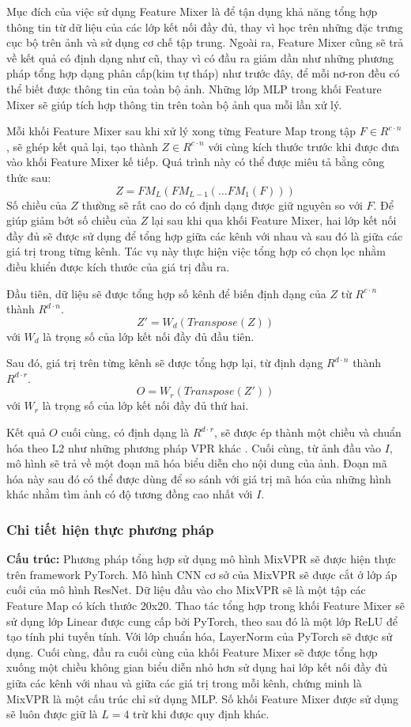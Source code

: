 Mục đích của việc sử dụng Feature Mixer là để tận dụng khả năng tổng hợp thông tin từ dữ liệu của các lớp kết nối đầy đủ, thay vì học trên những đặc trưng cục bộ trên ảnh và sử dụng cơ chế tập trung. Ngoài ra, Feature Mixer cũng sẽ trả về kết quả có định dạng như cũ, thay vì có đầu ra giảm dần như những phương pháp tổng hợp dạng phân cấp(kim tự tháp) như trước đây, để mỗi nơ-ron đều có thể biết được thông tin của toàn bộ ảnh. Những lớp MLP trong khối Feature Mixer sẽ giúp tích hợp thông tin trên toàn bộ ảnh qua mỗi lần xử lý.

Mỗi khối Feature Mixer sau khi xử lý xong từng Feature Map trong tập $F \in R^{c \cdot n}$, sẽ ghép kết quả lại, tạo thành $Z \in R^{c \cdot n}$ với cùng kích thước trước khi được đưa vào khối Feature Mixer kế tiếp. Quá trình này có thể được miêu tả bằng công thức sau:
$$
Z = FM_L(FM_{L-1}(\dots FM_1(F)))
$$
Số chiều của $Z$ thường sẽ rất cao do có định dạng được giữ nguyên so với $F$. Để giúp giảm bớt số chiều của $Z$ lại sau khi qua khối Feature Mixer, hai lớp kết nối đầy đủ sẽ được sử dụng để tổng hợp giữa các kênh với nhau và sau đó là giữa các giá trị trong từng kênh. Tác vụ này thực hiện việc tổng hợp có chọn lọc nhằm điều khiển được kích thước của giá trị đầu ra.

Đầu tiên, dữ liệu sẽ được tổng hợp số kênh để biến định dạng của $Z$ từ $R^{c \cdot n}$ thành $R^{d \cdot n}$.
$$
Z' = W_d(Transpose(Z))
$$
với $W_d$ là trọng số của lớp kết nối đầy đủ đầu tiên.

Sau đó, giá trị trên từng kênh sẽ được tổng hợp lại, từ định dạng $R^{d \cdot n}$ thành $R^{d \cdot r}$.
$$
O = W_r(Transpose(Z'))
$$
với $W_r$ là trọng số của lớp kết nối đầy đủ thứ hai.

Kết quả $O$ cuối cùng, có định dạng là $R^{d \cdot r}$, sẽ được ép thành một chiều và chuẩn hóa theo L2 như những phương pháp VPR khác \cite{arandjelović2016netvlad,berton2022rethinking}. Cuối cùng, từ ảnh đầu vào $I$, mô hình sẽ trả về một đoạn mã hóa biểu diễn cho nội dung của ảnh. Đoạn mã hóa này sau đó có thể được dùng để so sánh với giá trị mã hóa của những hình khác nhằm tìm ảnh có độ tương đồng cao nhất với $I$.

\subsubsection*{Chi tiết hiện thực phương pháp}
\textbf{Cấu trúc:} Phương pháp tổng hợp sử dụng mô hình MixVPR sẽ được hiện thực trên framework PyTorch. Mô hình CNN cơ sở của MixVPR sẽ được cắt ở lớp áp cuối của mô hình ResNet. Dữ liệu đầu vào cho MixVPR sẽ là một tập các Feature Map có kích thước 20x20. Thao tác tổng hợp trong khối Feature Mixer sẽ sử dụng lớp Linear được cung cấp bởi PyTorch, theo sau đó là một lớp ReLU để tạo tính phi tuyến tính. Với lớp chuẩn hóa, LayerNorm của PyTorch sẽ được sử dụng. Cuối cùng, đầu ra cuối cùng của khối Feature Mixer sẽ được tổng hợp xuống một chiều không gian biểu diễn nhỏ hơn sử dụng hai lớp kết nối đầy đủ giữa các kênh với nhau và giữa các giá trị trong mỗi kênh, chứng minh là MixVPR là một cấu trúc chỉ sử dụng MLP. Số khối Feature Mixer được sử dụng sẽ luôn được giữ là $L=4$ trừ khi được quy định khác.

